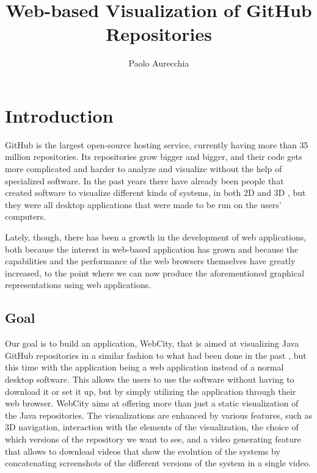 \documentclass[]{usiinfbachelorproject}
\author{Paolo Aurecchia}
\title{Web-based Visualization of GitHub Repositories}
\subtitle{}
\begin{document}
\maketitle

\tableofcontents
\pagebreak

\section{Introduction} \label{introduction}

GitHub is the largest open-source hosting service, currently having more than 35 million repositories. Its repositories grow bigger and bigger, and their code gets more complicated and harder to analyze and visualize without the help of specialized software. In the past years there have already been people that created software to visualize different kinds of systems, in both 2D and 3D \cite{Wett07b} \cite{Wett2008b} \cite{Wett2008a}, but they were all desktop applications that were made to be run on the users' computers.

Lately, though, there has been a growth in the development of web applications, both because the interest in web-based application has grown and because the capabilities and the performance of the web browsers themselves have greatly increased, to the point where we can now produce the aforementioned graphical representations using web applications.

\subsection{Goal} \label{Goal}
Our goal is to build an application, WebCity, that is aimed at visualizing Java GitHub repositories in a similar fashion to what had been done in the past \cite{Wett07b} \cite{Wett2008b} \cite{Wett2008a}, but this time with the application being a web application instead of a normal desktop software. This allows the users to use the software without having to download it or set it up, but by simply utilizing the application through their web browser.
WebCity aims at offering more than just a static visualization of the Java repositories. The visualizations are enhanced by various features, such as 3D navigation, interaction with the elements of the visualization, the choice of which versions of the repository we want to see, and a video generating feature that allows to download videos that show the evolution of the systems by concatenating screenshots of the different versions of the system in a single video.
\end{document}
